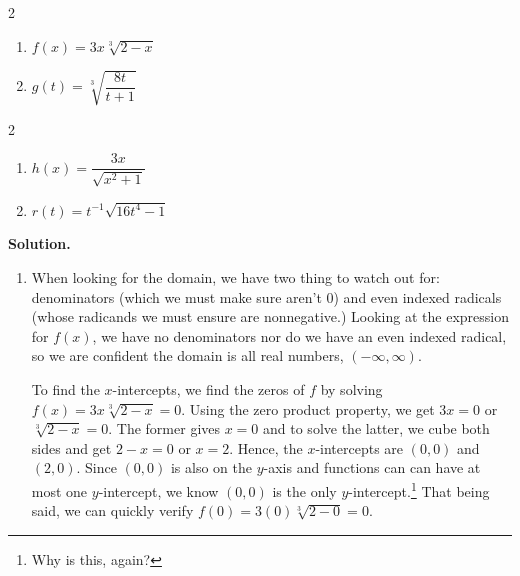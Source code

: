\documentclass{ximera}
\begin{document}
\begin{example}
\begin{itemize}
\end{itemize}

\begin{multicols}{2}
\begin{enumerate}

\item  $f(x) = 3x \sqrt[3]{2-x}$ 

\item  $g(t) = \sqrt[3]{\dfrac{8t}{t+1}}$

\setcounter{HW}{\value{enumi}}
\end{enumerate}
\end{multicols}

\begin{multicols}{2}
\begin{enumerate}
\setcounter{enumi}{\value{HW}}

\item  $h(x) = \dfrac{3x}{\sqrt{x^2 + 1}}$

\item  $r(t) = t^{-1} \sqrt{16t^4-1}$ 

\setcounter{HW}{\value{enumi}}
\end{enumerate}
\end{multicols}


{\bf Solution.} 

\begin{enumerate}

\item  When looking for the domain, we have two thing to watch out for:  denominators (which we must make sure aren't $0$) and even indexed radicals (whose radicands we must ensure are nonnegative.)  Looking at the expression for $f(x)$, we have no denominators nor do we have an even indexed radical, so we are confident the domain is all real numbers, $(-\infty, \infty)$. 

To find the $x$-intercepts, we find the zeros of $f$ by solving $f(x) =  3x \sqrt[3]{2-x} = 0$.  Using the zero product property, we get $3x = 0$ or $\sqrt[3]{2-x} = 0$.  The former gives $x = 0$ and to solve the latter, we cube both sides and get $2 - x = 0$ or $x = 2$.  Hence, the $x$-intercepts are $(0,0)$ and $(2,0)$.  Since $(0,0)$ is also on the $y$-axis and functions can can have at most one $y$-intercept, we know $(0,0)$ is the only $y$-intercept.\footnote{Why is this, again?}  That being said, we can quickly verify $f(0) = 3(0) \sqrt[3]{2-0} = 0$. 


\end{enumerate}
\end{example}
\end{document}
